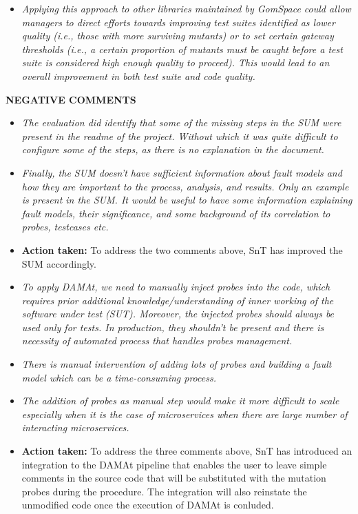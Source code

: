 \begin{itemize}
\item \emph{Applying this approach to other libraries maintained by GomSpace could allow managers to direct efforts towards improving test suites identified as lower quality (i.e., those with more surviving mutants) or to set certain gateway thresholds (i.e., a certain proportion of mutants must be caught before a test suite is considered high enough quality to proceed). This would lead to an overall improvement in both test suite and code quality.}

 \end{itemize}


\textbf{NEGATIVE COMMENTS}

\begin{itemize}
\item \emph{The evaluation did identify that some of the missing steps in the SUM were present in the readme of the project. Without which it was quite difficult to configure some of the steps, as there is no explanation in the document.}

\item \emph{Finally, the SUM doesn’t have sufficient information about fault models and how they are important to the process, analysis, and results. Only an example is present in the SUM. It would be useful to have some information explaining fault models, their significance, and some background of its correlation to probes, testcases etc.}

\item \textbf{Action taken:} To address the two comments above, SnT has improved the SUM accordingly.

\item \emph{To apply DAMAt, we need to manually inject probes into the code, which requires prior additional knowledge/understanding of inner working of the software under test (SUT). Moreover, the injected probes should always be used only for tests. In production, they shouldn’t be present and there is necessity of automated process that handles probes management.}

\item \emph{There is manual intervention of adding lots of probes and building a fault model which can be a time-consuming process.}

\item \emph{The addition of probes as manual step would make it more difficult to scale especially when it is the case of microservices when there are large number of interacting microservices.}

\item \textbf{Action taken:} To address the three comments above, SnT has introduced an integration to the DAMAt pipeline that enables the user to leave simple comments in the source code that will be substituted with the mutation probes during the procedure. The integration will also reinstate the unmodified code once the execution of DAMAt is conluded.

\end{itemize}

